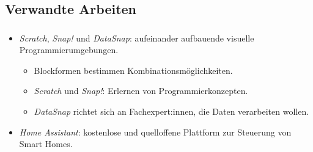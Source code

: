 \subsection{Verwandte Arbeiten}
\begin{frame}
  \frametitle{\currentsectionname}

  \begin{itemize}
    \item \textit{Scratch}, \textit{Snap!} und \textit{DataSnap}: aufeinander aufbauende visuelle Programmierumgebungen.
      \begin{itemize}
        \item Blockformen bestimmen Kombinationsmöglichkeiten.
        \item \textit{Scratch} und \textit{Snap!}: Erlernen von Programmierkonzepten.
        \item \textit{DataSnap} richtet sich an Fachexpert:innen, die Daten verarbeiten wollen.
      \end{itemize}
    \item \textit{Home Assistant}: kostenlose und quelloffene Plattform zur Steuerung von Smart Homes.
  \end{itemize}


\end{frame}

%
%
%


